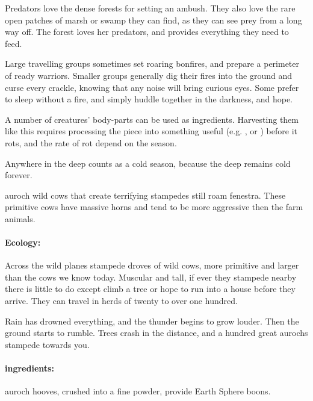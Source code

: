 \begin{multicols}{2}

\noindent
Predators love the dense forests for setting an ambush.
They also love the rare open patches of marsh or swamp they can find, as they can see prey from a long way off.
The forest loves her predators, and provides everything they need to feed.

Large travelling groups sometimes set roaring bonfires, and prepare a perimeter of ready warriors.
Smaller groups generally dig their fires into the ground and curse every crackle, knowing that any noise will bring curious eyes.
Some prefer to sleep without a fire, and simply huddle together in the darkness, and hope.

\rotRates
A number of creatures' body-parts can be used as \glspl{ingredient}.
Harvesting them like this requires processing the piece into something useful (e.g. , or ) before it rots, and the rate of rot depend on the season.

Anywhere in the \gls{deep} counts as a cold season, because the \gls{deep} remains cold forever.

  {auroch}%
  {wild cows that create terrifying stampedes}%
still roam \gls{fenestra}.
These primitive cows have massive horns and tend to be more aggressive then the farm animals.


\paragraph{Ecology:} Across the wild planes stampede droves of wild cows, more primitive and larger than the cows we know today.
Muscular and tall, if ever they stampede nearby there is little to do except climb a tree or hope to run into a house before they arrive.
They can travel in herds of twenty to over one hundred.

\begin{boxtext}
  Rain has drowned everything, and the thunder begins to grow louder.
  Then the ground starts to rumble.
  Trees crash in the distance, and a hundred great aurochs stampede towards you.
\end{boxtext}

\paragraph{\Glspl{ingredient}:}
auroch hooves, crushed into a fine powder, provide Earth Sphere \glspl{boon}.


\end{multicols}
